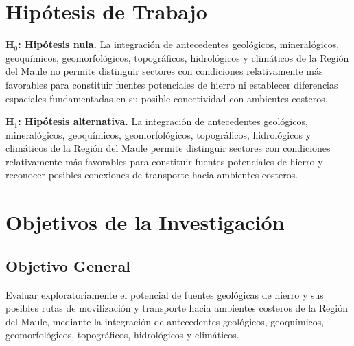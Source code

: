 
\section{Hipótesis de Trabajo}%

\textbf{H$_0$: Hipótesis nula.} La integración de antecedentes geológicos, mineralógicos, geoquímicos, geomorfológicos, topográficos, hidrológicos y climáticos de la Región del Maule no permite distinguir sectores con condiciones relativamente más favorables para constituir fuentes potenciales de hierro ni establecer diferencias espaciales fundamentadas en su posible conectividad con ambientes costeros.

\medskip

\textbf{H$_1$: Hipótesis alternativa.} La integración de antecedentes geológicos, mineralógicos, geoquímicos, geomorfológicos, topográficos, hidrológicos y climáticos de la Región del Maule permite distinguir sectores con condiciones relativamente más favorables para constituir fuentes potenciales de hierro y reconocer posibles conexiones de transporte hacia ambientes costeros.

\section{Objetivos de la Investigación}

\subsection{Objetivo General}
Evaluar exploratoriamente el potencial de fuentes geológicas de hierro y sus posibles rutas de movilización y transporte hacia ambientes costeros de la Región del Maule, mediante la integración de antecedentes geológicos, geoquímicos, geomorfológicos, topográficos, hidrológicos y climáticos.

